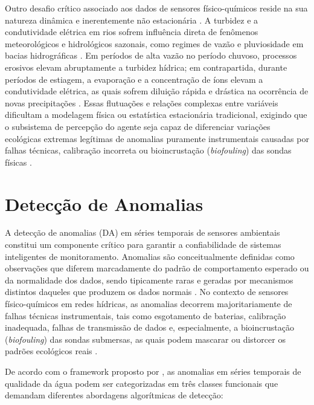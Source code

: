 Outro desafio crítico associado aos dados de sensores físico-químicos reside na sua natureza dinâmica e inerentemente não estacionária \cite{leigh2019framework}. A turbidez e a condutividade elétrica em rios sofrem influência direta de fenômenos meteorológicos e hidrológicos sazonais, como regimes de vazão e pluviosidade em bacias hidrográficas \cite{leigh2019framework}. Em períodos de alta vazão no período chuvoso, processos erosivos elevam abruptamente a turbidez hídrica; em contrapartida, durante períodos de estiagem, a evaporação e a concentração de íons elevam a condutividade elétrica, as quais sofrem diluição rápida e drástica na ocorrência de novas precipitações \cite{leigh2019framework}. Essas flutuações e relações complexas entre variáveis dificultam a modelagem física ou estatística estacionária tradicional, exigindo que o subsistema de percepção do agente seja capaz de diferenciar variações ecológicas extremas legítimas de anomalias puramente instrumentais causadas por falhas técnicas, calibração incorreta ou bioincrustação (\textit{biofouling}) das sondas físicas \cite{leigh2019framework}.


\section{Detecção de Anomalias}
\label{sec:deteccao_anomalias}

A detecção de anomalias (DA) em séries temporais de sensores ambientais constitui um componente crítico para garantir a confiabilidade de sistemas inteligentes de monitoramento. Anomalias são conceitualmente definidas como observações que diferem marcadamente do padrão de comportamento esperado ou da normalidade dos dados, sendo tipicamente raras e geradas por mecanismos distintos daqueles que produzem os dados normais \cite{leigh2019framework, sun2019building}. No contexto de sensores físico-químicos em redes hídricas, as anomalias decorrem majoritariamente de falhas técnicas instrumentais, tais como esgotamento de baterias, calibração inadequada, falhas de transmissão de dados e, especialmente, a bioincrustação (\textit{biofouling}) das sondas submersas, as quais podem mascarar ou distorcer os padrões ecológicos reais \cite{leigh2019framework}.

De acordo com o framework proposto por , as anomalias em séries temporais de qualidade da água podem ser categorizadas em três classes funcionais que demandam diferentes abordagens algorítmicas de detecção:

